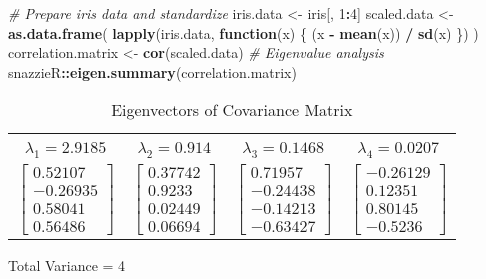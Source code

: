 \documentclass[
]{article}
\newenvironment{Shaded}{\begin{snugshade}}{\end{snugshade}}
\newcommand{\CommentTok}[1]{\textcolor[rgb]{0.56,0.35,0.01}{\textit{#1}}}
\newcommand{\ControlFlowTok}[1]{\textcolor[rgb]{0.13,0.29,0.53}{\textbf{#1}}}
\newcommand{\DecValTok}[1]{\textcolor[rgb]{0.00,0.00,0.81}{#1}}
\newcommand{\FunctionTok}[1]{\textcolor[rgb]{0.13,0.29,0.53}{\textbf{#1}}}
\newcommand{\NormalTok}[1]{#1}
\newcommand{\OtherTok}[1]{\textcolor[rgb]{0.56,0.35,0.01}{#1}}
\newcommand{\SpecialCharTok}[1]{\textcolor[rgb]{0.81,0.36,0.00}{\textbf{#1}}}
\begin{document}
\begin{Shaded}
\begin{Highlighting}[]
\CommentTok{\# Prepare iris data and standardize}
\NormalTok{iris.data }\OtherTok{\textless{}{-}}\NormalTok{ iris[, }\DecValTok{1}\SpecialCharTok{:}\DecValTok{4}\NormalTok{]}
\NormalTok{scaled.data }\OtherTok{\textless{}{-}} \FunctionTok{as.data.frame}\NormalTok{(}
  \FunctionTok{lapply}\NormalTok{(iris.data, }\ControlFlowTok{function}\NormalTok{(x) \{}
\NormalTok{    (x }\SpecialCharTok{{-}} \FunctionTok{mean}\NormalTok{(x)) }\SpecialCharTok{/} \FunctionTok{sd}\NormalTok{(x)}
\NormalTok{  \})}
\NormalTok{)}
\NormalTok{correlation.matrix }\OtherTok{\textless{}{-}} \FunctionTok{cor}\NormalTok{(scaled.data)}
\CommentTok{\# Eigenvalue analysis}
\NormalTok{snazzieR}\SpecialCharTok{::}\FunctionTok{eigen.summary}\NormalTok{(correlation.matrix)}
\end{Highlighting}
\end{Shaded}

\begin{table}[!h]
\centering
\caption{\label{tab:unnamed-chunk-7}Eigenvectors of Covariance Matrix}
\centering
\begin{threeparttable}
\begin{tabular}[t]{cccc}

\multicolumn{1}{c}{ } \\
$\lambda_1 = 2.9185$ & $\lambda_2 = 0.914$ & $\lambda_3 = 0.1468$ & $\lambda_4 = 0.0207$\\
\arrayrulecolor{white}
\midrule
$\begin{bmatrix}0.52107\\-0.26935\\0.58041\\0.56486\end{bmatrix}$ & $\begin{bmatrix}0.37742\\0.9233\\0.02449\\0.06694\end{bmatrix}$ & $\begin{bmatrix}0.71957\\-0.24438\\-0.14213\\-0.63427\end{bmatrix}$ & $\begin{bmatrix}-0.26129\\0.12351\\0.80145\\-0.5236\end{bmatrix}$\\
\bottomrule
\end{tabular}
\begin{tablenotes}[para]
\item Total Variance = 4
\end{tablenotes}
\end{threeparttable}
\end{table}
\end{document}
